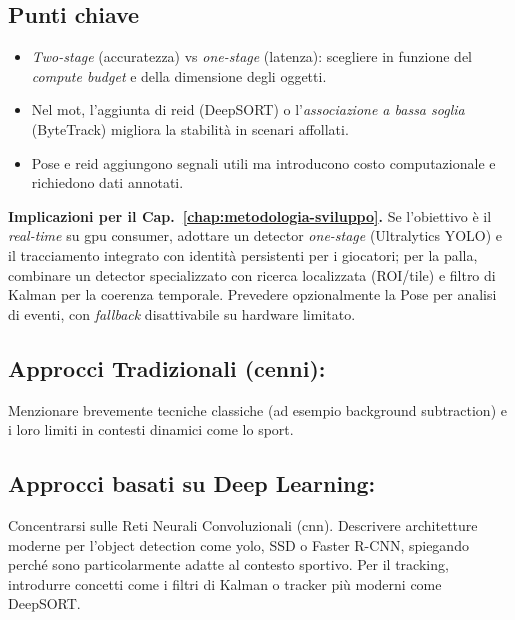 \documentclass[12pt,a4paper,openright,twoside]{book}
\begin{document}
\subsection*{Punti chiave}
\begin{itemize}
  \item \emph{Two-stage} (accuratezza) vs \emph{one-stage} (latenza): scegliere in funzione del \emph{compute budget} e della dimensione degli oggetti.
  \item Nel \ac{mot}, l'aggiunta di \ac{reid} (DeepSORT) o l'\emph{associazione a bassa soglia} (ByteTrack) migliora la stabilità in scenari affollati.
  \item Pose e \ac{reid} aggiungono segnali utili ma introducono costo computazionale e richiedono dati annotati.
\end{itemize}
\textbf{Implicazioni per il Cap.~\ref{chap:metodologia-sviluppo}.}
Se l'obiettivo è il \emph{real-time} su \ac{gpu} consumer, adottare un detector \emph{one-stage} (Ultralytics YOLO) e il tracciamento
integrato con identità persistenti per i giocatori; per la palla, combinare un detector specializzato con ricerca localizzata (ROI/tile)
e filtro di Kalman per la coerenza temporale. Prevedere opzionalmente la Pose per analisi di eventi, con \emph{fallback}
disattivabile su hardware limitato. 


\subsection{Approcci Tradizionali (cenni):}
\label{sec:approcci-tradizionali}
Menzionare brevemente tecniche classiche (ad esempio background subtraction) e i loro limiti in contesti dinamici 
come lo sport.

\subsection{Approcci basati su Deep Learning:}
\label{sec:approcci-deep-learning}
Concentrarsi sulle Reti Neurali Convoluzionali (\ac{cnn}). Descrivere architetture moderne per l'object detection
come \ac{yolo}, SSD o Faster R-CNN, spiegando perché sono particolarmente adatte al contesto sportivo. 
Per il tracking, introdurre concetti come i filtri di Kalman o tracker più moderni come DeepSORT.


\end{document}

